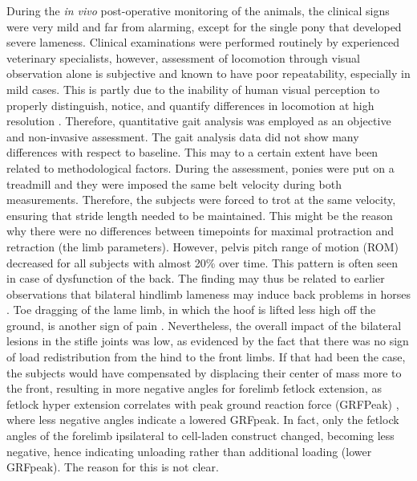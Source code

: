 \documentclass[twocolumn, serif, empirical, authordate, seplic]{jote-article}
\begin{document}
During the \emph{in vivo} post-operative monitoring of the animals, the clinical signs were very mild and far from alarming, except for the single pony that developed severe lameness. Clinical examinations were performed routinely by experienced veterinary specialists, however, assessment of locomotion through visual observation alone is subjective and known to have poor repeatability, especially in mild cases. This is partly due to the inability of human visual perception to properly distinguish, notice, and quantify differences in locomotion at high resolution \parencite{SerraBraganca2018}. Therefore, quantitative gait analysis was employed as an objective and non-invasive assessment. The gait analysis data did not show many differences with respect to baseline. This may to a certain extent have been related to methodological factors. During the assessment, ponies were put on a treadmill and they were imposed the same belt velocity during both measurements. Therefore, the subjects were forced to trot at the same velocity, ensuring that stride length needed to be maintained. This might be the reason why there were no differences between timepoints for maximal protraction and retraction (the limb parameters). However, pelvis pitch range of motion (ROM) decreased for all subjects with almost 20\% over time. This pattern is often seen in case of dysfunction of the back. The finding may thus be related to earlier observations that bilateral hindlimb lameness may induce back problems in horses \parencite{Alvarez2008, Alvarez2007, Greve2017}. Toe dragging of the lame limb, in which the hoof is lifted less high off the ground, is another sign of pain \parencite{Buchner1995}. Nevertheless, the overall impact of the bilateral lesions in the stifle joints was low, as evidenced by the fact that there was no sign of load redistribution from the hind to the front limbs. If that had been the case, the subjects would have compensated by displacing their center of mass more to the front, resulting in more negative angles for forelimb fetlock extension, as fetlock hyper extension correlates with peak ground reaction force (GRFPeak) \parencite{Crevier-Denoix2010}, where less negative angles indicate a lowered GRFpeak. In fact, only the fetlock angles of the forelimb ipsilateral to cell-laden construct changed, becoming less negative, hence indicating unloading rather than additional loading (lower GRFpeak). The reason for this is not clear.
\end{document}
